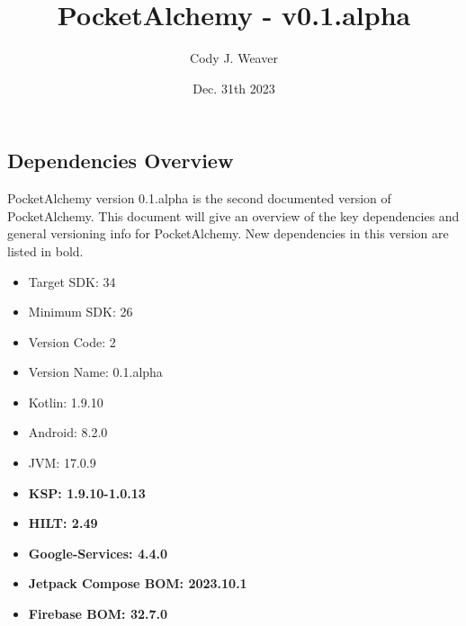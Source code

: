 \documentclass[12pt]{article}
\begin{document}
\title{PocketAlchemy - v0.1.alpha}
\author{Cody J. Weaver}
\date{Dec. 31th 2023}
\maketitle


\begin{center}
    
    \section*{Dependencies Overview}
    \indent PocketAlchemy version 0.1.alpha is the second documented version of PocketAlchemy. This document will give an overview of the 
    key dependencies and general versioning info for PocketAlchemy. New dependencies in this 
    version are listed in bold.

    \begin{itemize}
        \item Target SDK\@: 34
        \item Minimum SDK\@: 26
        \item Version Code: 2
        \item Version Name: 0.1.alpha
        \item Kotlin: 1.9.10
        \item Android: 8.2.0
        \item JVM\@: 17.0.9
        \item \textbf{KSP\@: 1.9.10-1.0.13}
        \item \textbf{HILT\@: 2.49}
        \item \textbf{Google-Services: 4.4.0}
        \item \textbf{Jetpack Compose BOM\@: 2023.10.1}
        \item \textbf{Firebase BOM\@: 32.7.0}

    \end{itemize}

\end{center}
\end{document}
